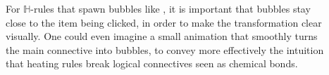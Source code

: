 \begin{description}
  \item[\textbf{\heating}]
    For $\mathbb{H}$-rules that spawn bubbles like {\rnm{\land{+}}}, it is
    important that bubbles stay close to the item being clicked, in order to
    make the transformation clear visually. One could even imagine a small
    animation that smoothly turns the main connective into bubbles, to convey
    more effectively the intuition that heating rules break logical connectives
    seen as chemical bonds.

\end{description}

